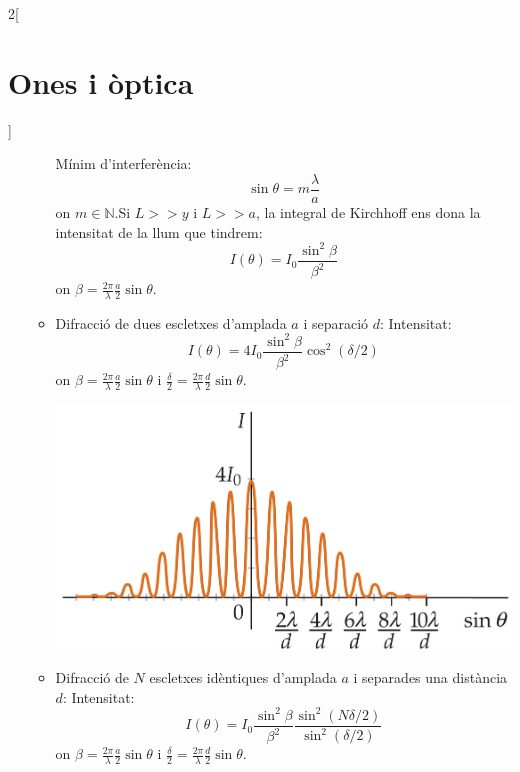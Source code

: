 \documentclass[../../../main.tex]{subfiles}
\begin{document}
\begin{multicols}{2}[\section{Ones i òptica}]
\begin{itemize}
\begin{itemize}
\begin{minipage}{\linewidth}
                  \end{minipage}
                  Mínim d'interferència:
                  $$\sin\theta=m\frac{\lambda}{a}$$ {\footnotesize on $m\in\mathbb{N}$}.\newline Si $L>>y$ i $L>>a$, la integral de Kirchhoff ens dona la intensitat de la llum que tindrem: $$I(\theta)=I_0\frac{\sin^2\beta}{\beta^2}$$ {\footnotesize on $\beta=\frac{2\pi}{\lambda}\frac{a}{2}\sin\theta$.}
            \item Difracció de dues escletxes d'am\-pla\-da $a$ i separació $d$:\newline
                  Intensitat: $$I(\theta)=4I_0\frac{\sin^2\beta}{\beta^2}\cos^2(\delta/2)$$ {\footnotesize on $\beta=\frac{2\pi}{\lambda}\frac{a}{2}\sin\theta$ i $\frac{\delta}{2}=\frac{2\pi}{\lambda}\frac{d}{2}\sin\theta$.}\newline      \begin{minipage}{\linewidth}
                    \includegraphics[width=\linewidth]{Physics/1st/Waves_and_optics/Images/dif2.jpg}
                  \end{minipage}
            \item Difracció de $N$ escletxes i\-dèn\-ti\-ques d'amplada $a$ i separades una distància $d$:\newline
                  Intensitat: $$I(\theta)=I_0\frac{\sin^2\beta}{\beta^2}\frac{\sin^2(N\delta/2)}{\sin^2(\delta/2)}$$ {\footnotesize on $\beta=\frac{2\pi}{\lambda}\frac{a}{2}\sin\theta$ i $\frac{\delta}{2}=\frac{2\pi}{\lambda}\frac{d}{2}\sin\theta$.}\newline

\end{itemize}
\end{itemize}
\end{multicols}
\end{document}
